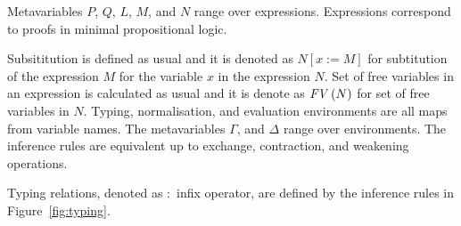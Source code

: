 \documentclass[11p,a4paper]{article}
\newcommand{\sbs}[3]{#1[#2:=#3]}
\newcommand{\fv}[1]{\txt{FV}\,(#1)}
\newcommand{\txt}[1]{\text{\emph{#1}}}
\begin{document}
Metavariables $P$, $Q$, $L$, $M$, and $N$ range over
expressions. Expressions correspond to proofs in minimal propositional
logic.

Subsititution is defined as usual and it is denoted as
$\sbs{N}{x}{M}$ for subtitution of the expression $M$ for the
variable $x$ in the expression $N$. Set of free variables in an
expression is calculated as usual and it is denote as $\fv{N}$ for
set of free variables in $N$.
Typing, normalisation, and evaluation environments are all maps from
variable names. The metavariables $\Gamma$, and $\Delta$ range over
environments.  The inference rules are equivalent up to exchange,
contraction, and weakening operations.

Typing relations, denoted as $:$ infix operator, are defined by
the inference rules in Figure~\ref{fig:typing}.
\end{document}
